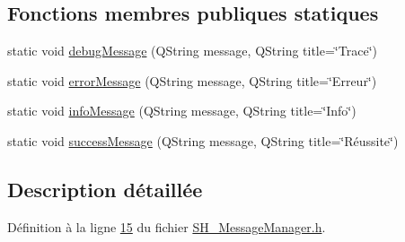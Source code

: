 \subsection*{Fonctions membres publiques statiques}
\begin{DoxyCompactItemize}
\item 
static void \hyperlink{classSimpleHotel_1_1SH__MessageManager_ad680f823897b7bf70e46ee18326c08b2}{debug\-Message} (Q\-String message, Q\-String title=\char`\"{}Trace\char`\"{})
\item 
static void \hyperlink{classSimpleHotel_1_1SH__MessageManager_a77bc12a66f3eaa8f3668d8197c0b8f6d}{error\-Message} (Q\-String message, Q\-String title=\char`\"{}Erreur\char`\"{})
\item 
static void \hyperlink{classSimpleHotel_1_1SH__MessageManager_a76697bfabd6917a3b20ed58c22a34ed7}{info\-Message} (Q\-String message, Q\-String title=\char`\"{}Info\char`\"{})
\item 
static void \hyperlink{classSimpleHotel_1_1SH__MessageManager_aa6ba9bbdf030438fcce50333968dcce0}{success\-Message} (Q\-String message, Q\-String title=\char`\"{}Réussite\char`\"{})
\end{DoxyCompactItemize}


\subsection{Description détaillée}


Définition à la ligne \hyperlink{SH__MessageManager_8h_source_l00015}{15} du fichier \hyperlink{SH__MessageManager_8h_source}{S\-H\-\_\-\-Message\-Manager.\-h}.



